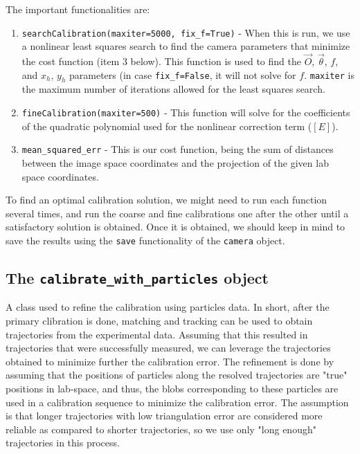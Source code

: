 \documentclass[10pt,a4paper]{article}
\begin{document}
The important functionalities are:
%
\begin{enumerate}
	
	\item \texttt{searchCalibration(maxiter=5000, fix\_f=True)} - When this is run, we use a nonlinear least squares search to find the camera parameters that minimize the cost function (item 3 below). This function is used to find the $\vec{O}$, $\vec{\theta}$, $f$, and $x_h, \, y_h$ parameters (in case \texttt{fix\_f=False}, it will not solve for $f$. \texttt{maxiter} is the maximum number of iterations allowed for the least squares search.
	
	\item \texttt{fineCalibration(maxiter=500)} - This function will solve for the coefficients of the quadratic polynomial used for the nonlinear correction term ($[E]$). 
	
	\item \texttt{mean\_squared\_err} - This is our cost function, being the sum of distances between the image space coordinates and the projection of the given lab space coordinates.
	
\end{enumerate}
%
To find an optimal calibration solution, we might need to run each function several times, and run the coarse and fine calibrations one after the other until a satisfactory solution is obtained. Once it is obtained, we should keep in mind to save the results using the \texttt{save} functionality of the \texttt{camera} object. 





\subsection{The \texttt{calibrate\_with\_particles} object}\label{sec:calibrate_with_particles_obj}

A class used to refine the calibration using particles data. In short,
after the primary clibration is done, matching and tracking can be used
to obtain trajectories from the experimental data. Assuming that this resulted in trajectories that were successfully measured, we can leverage
the trajectories obtained to minimize further the calibration error. The refinement is done by assuming that the positions of particles along the resolved trajectories are "true" positions in lab-space, and thus, the blobs corresponding to these particles are used in a calibration sequence to minimize the calibration error. The assumption is that longer trajectories with low triangulation error are considered more reliable as compared to shorter trajectories, so we use only "long enough" trajectories 
in this process.
\end{document}
